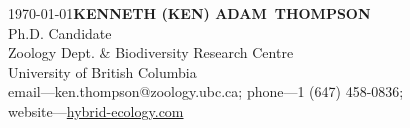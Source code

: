 \documentclass[11pt]{article}
\begin{document}
\thispagestyle{empty} 
\pagestyle{fancy}

\newenvironment{rSection}[1]{ %
  \sectionskip
  \MakeUppercase{\bf #1} %
  \sectionlineskip
  \hrule %
  \vspace{0.25em} %
}

\def\namesize{\huge} %
\def\addressskip{\smallskip} %
\def\sectionlineskip{\smallskip} %
\def\nameskip{\bigskip} %
\def\sectionskip{\medskip} %


{\raggedleft
\noindent \today \hfill \Large{\textbf{KENNETH (KEN) ADAM\ THOMPSON}}\\
\large Ph.D. Candidate\\
\large Zoology Dept. \& Biodiversity Research Centre \\
\large University of British Columbia \\
\large email---ken.thompson@zoology.ubc.ca; phone---1 (647) 458-0836; \\
\large website---\href {https://hybrid-ecology.com}{hybrid-ecology.com}\\
}



\end{document}
